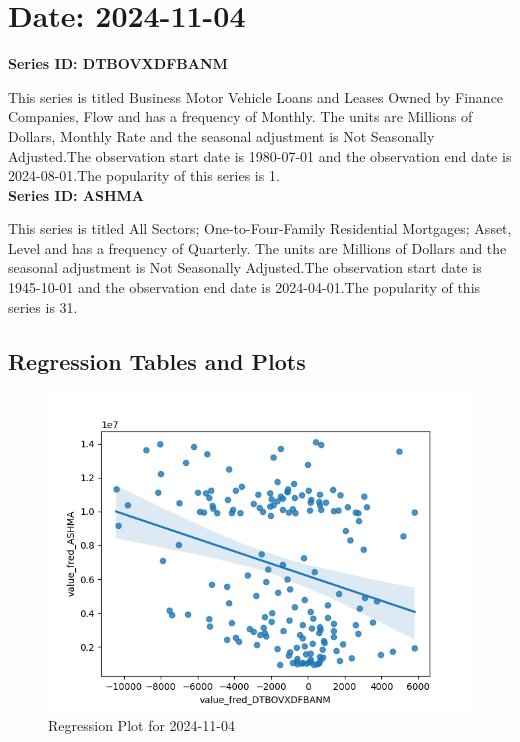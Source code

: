 \section{Date: 2024-11-04}
\noindent \textbf{Series ID: DTBOVXDFBANM} 

\noindent This series is titled Business Motor Vehicle Loans and Leases Owned by Finance Companies, Flow and has a frequency of Monthly. The units are Millions of Dollars, Monthly Rate and the seasonal adjustment is Not Seasonally Adjusted.The observation start date is 1980-07-01 and the observation end date is 2024-08-01.The popularity of this series is 1. \\ 

\noindent \textbf{Series ID: ASHMA} 

\noindent This series is titled All Sectors; One-to-Four-Family Residential Mortgages; Asset, Level and has a frequency of Quarterly. The units are Millions of Dollars and the seasonal adjustment is Not Seasonally Adjusted.The observation start date is 1945-10-01 and the observation end date is 2024-04-01.The popularity of this series is 31. \\ 

\subsection{Regression Tables and Plots}


\begin{figure}
\centering
\includegraphics[scale = 0.9]{plots/plot_2024-11-04.png}
\caption{Regression Plot for 2024-11-04}
\end{figure}
\newpage
